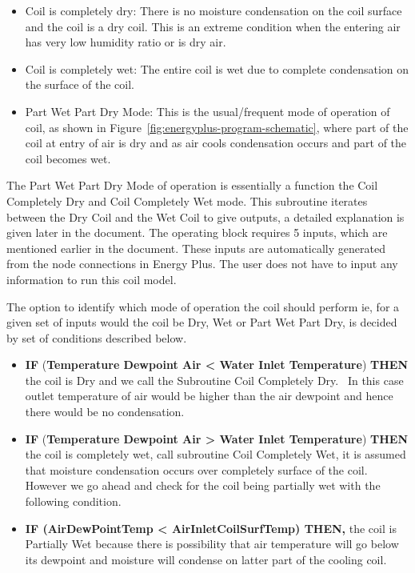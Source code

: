 \begin{itemize}
  \item
    Coil is completely dry: There is no moisture condensation on the coil surface and the coil is a dry coil. This is an extreme condition when the entering air has very low humidity ratio or is dry air.
  \item
    Coil is completely wet: The entire coil is wet due to complete condensation on the surface of the coil.
  \item
    Part Wet Part Dry Mode: This is the usual/frequent mode of operation of coil, as shown in Figure~\ref{fig:energyplus-program-schematic}, where part of the coil at entry of air is dry and as air cools condensation occurs and part of the coil becomes wet.
\end{itemize}

The Part Wet Part Dry Mode of operation is essentially a function the Coil Completely Dry and Coil Completely Wet mode. This subroutine iterates between the Dry Coil and the Wet Coil to give outputs, a detailed explanation is given later in the document. The operating block requires 5 inputs, which are mentioned earlier in the document. These inputs are automatically generated from the node connections in Energy Plus. The user does not have to input any information to run this coil model.

The option to identify which mode of operation the coil should perform ie, for a given set of inputs would the coil be Dry, Wet or Part Wet Part Dry, is decided by set of conditions described below.

\begin{itemize}
  \item
    \textbf{IF} (\textbf{Temperature Dewpoint Air \textless{} Water Inlet Temperature}) \textbf{THEN} the coil is Dry and we call the Subroutine Coil Completely Dry. ~In this case outlet temperature of air would be higher than the air dewpoint and hence there would be no condensation.
  \item
    \textbf{IF} (\textbf{Temperature Dewpoint Air \textgreater{} Water Inlet Temperature}) \textbf{THEN} the coil is completely wet, call subroutine Coil Completely Wet, it is assumed that moisture condensation occurs over completely surface of the coil. However we go ahead and check for the coil being partially wet with the following condition.
  \item
    \textbf{IF (AirDewPointTemp \textless{} AirInletCoilSurfTemp) THEN,} the coil is Partially Wet because there is possibility that air temperature will go below its dewpoint and moisture will condense on latter part of the cooling coil.
\end{itemize}


